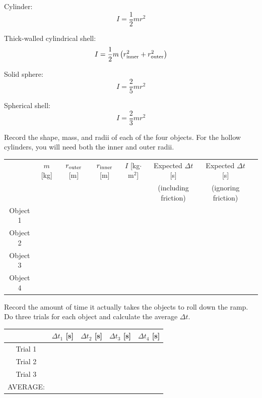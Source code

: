 \documentclass[11pt,letterpaper]{article}
\begin{document}
Cylinder:
$$I=\frac{1}{2}mr^2$$

Thick-walled cylindrical shell:
$$I=\frac{1}{2}m\left(r_{\rm inner}^2+r_{\rm outer}^2\right)$$

Solid sphere:
$$I=\frac{2}{5}mr^2$$

Spherical shell:
$$I=\frac{2}{3}mr^2$$

\vspace{1cm}

Record the shape, mass, and radii of each of the four objects. For the hollow cylinders, you will need both the inner and outer radii.

\renewcommand{\arraystretch}{1.4}
\begin{table}[h!]
\begin{tabular}{|c|c|c|c|c|c|c|c|}
\hline
& $m$ [kg] & $r_{\rm outer}$ [m] & $r_{\rm inner}$ [m] & $I$ [kg$\cdot$m$^2$] & Expected $\Delta{t}$ [s] & Expected $\Delta{t}$ [s]\\
& & & & & (including friction) & (ignoring friction)\\
\hline Object 1 & \hspace{1.5cm} & \hspace{1.5cm} & \hspace{1.5cm} & \hspace{1.5cm} & \hspace{1.5cm} & \hspace{1.5cm} \\
\hline Object 2 & & & & & & \\
\hline Object 3 & & & & & & \\
\hline Object 4 & & & & & & \\
\hline
\end{tabular}
\end{table}

Record the amount of time it actually takes the objects to roll down the ramp. Do three trials for each object and calculate the average $\Delta{t}$.
\begin{table}[h!]
\begin{tabular}{|c|c|c|c|c|}
\hline & $\Delta{t_1}$ [s] & $\Delta{t_2}$  [s] & $\Delta{t_3}$ [s] & $\Delta{t_4}$  [s] \\
\hline Trial 1 & \hspace{3cm} &\hspace{3cm} & \hspace{3cm} & \hspace{3cm} \\
\hline Trial 2 & & & & \\
\hline Trial 3 & & & & \\
\hline\hline AVERAGE: & & & & \\
\hline
\end{tabular}
\end{table}
\end{document}
